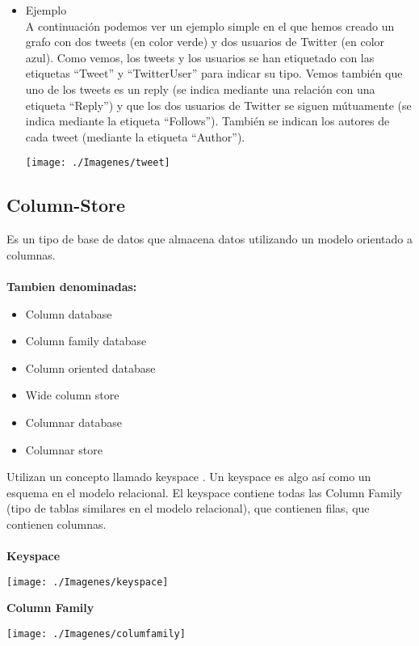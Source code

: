 \documentclass[twoside,twocolumn]{article}
\begin{document}
\begin{itemize}
\item Ejemplo
\\ A continuación podemos ver un ejemplo simple en el que hemos creado un grafo con dos tweets (en color verde) y dos usuarios de Twitter (en color azul). Como vemos, los tweets y los usuarios se han etiquetado con las etiquetas “Tweet” y “TwitterUser” para indicar su tipo. Vemos también que uno de los tweets es un reply (se indica mediante una relación con una etiqueta “Reply”) y que los dos usuarios de Twitter se siguen mútuamente (se indica mediante la etiqueta “Follows”). También se indican los autores de cada tweet (mediante la etiqueta “Author”).


\begin{center}
	\texttt{[image: ./Imagenes/tweet]} 
\end{center}

\end{itemize} 

\subsection{Column-Store}
Es un tipo de base de datos que almacena datos utilizando un modelo orientado a columnas.
\\
\\
	\textbf{Tambien denominadas:}
\begin{itemize}	

	\item Column database
	\item Column family database
	\item Column oriented database
	\item Wide column store
	\item Columnar database
	\item Columnar store
\end{itemize} 
Utilizan un concepto llamado  keyspace . Un keyspace es algo así como un  esquema en el modelo relacional. El keyspace contiene todas las Column Family (tipo de tablas similares  en el modelo relacional), que contienen filas, que contienen columnas.
\\
\\
\textbf{Keyspace}
\begin{center}
	\texttt{[image: ./Imagenes/keyspace]} 
\end{center}

\textbf{Column Family}
\begin{center}
	\texttt{[image: ./Imagenes/columfamily]} 
\end{center}
\end{document}
